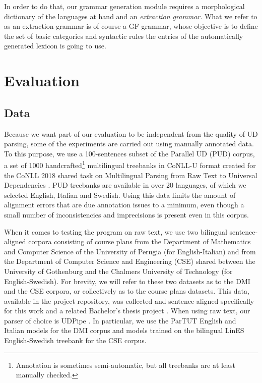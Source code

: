 \documentclass[11pt]{article}
\begin{document}
In order to do that, our grammar generation module requires a morphological dictionary of the languages at hand and an \textit{extraction grammar}. 
What we refer to as an extraction grammar is of course a GF grammar, whose objective is to define the set of basic categories and syntactic rules the entries of the automatically generated lexicon is going to use.


\section{Evaluation} \label{evaluation}
\subsection{Data}
Because we want part of our evaluation to be independent from the quality of UD parsing, some of the experiments are carried out using manually annotated data. 
To this purpose, we use a 100-sentences subset of the Parallel UD (PUD) corpus, a set of 1000 handcrafted\footnote{Annotation is sometimes semi-automatic, but all treebanks are at least manually checked.} multilingual treebanks in CoNLL-U format created for the CoNLL 2018 shared task on Multilingual Parsing from Raw Text to Universal Dependencies \cite{zeman-etal-2018-conll}.
PUD treebanks are available in over 20 languages, of which we selected English, Italian and Swedish. 
Using this data limits the amount of alignment errors that are due annotation issues to a minimum, even though a small number of inconsistencies and imprecisions is present even in this corpus.

When it comes to testing the program on raw text, we use two bilingual sentence-aligned corpora consisting of course plans from the Department of Mathematics and Computer Science of the University of Perugia (for English-Italian) and from the Department of Computer Science and Engineering (CSE) shared between the University of Gothenburg and the Chalmers University of Technology (for English-Swedish). 
For brevity, we will refer to these two datasets as to the DMI and the CSE corpora, or collectively as to the course plans datasets.
This data, available in the project repository, was collected and sentence-aligned specifically for this work and a related Bachelor's thesis project \cite{thesis}.
When using raw text, our parser of choice is UDPipe \cite{straka-etal-2016-udpipe}. 
In particular, we use the ParTUT English and Italian models for the DMI corpus and models trained on the bilingual LinES English-Swedish treebank for the CSE corpus.
\end{document}
